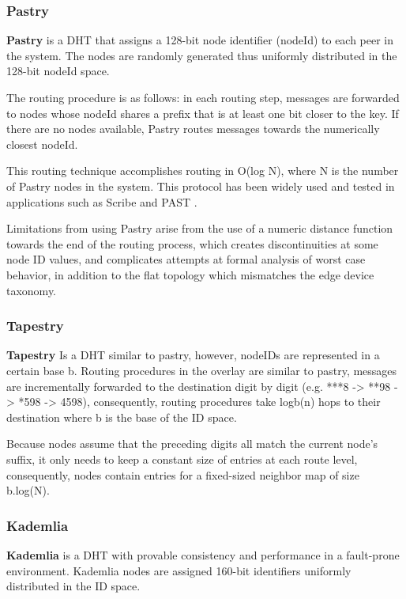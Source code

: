 \subsubsection*{Pastry}

\textbf{Pastry} \cite{rowstron2001pastry} is a DHT that assigns a 128-bit node identifier (nodeId) to each peer in the system. The nodes are randomly generated thus uniformly distributed in the 128-bit nodeId space. 

The routing procedure is as follows: in each routing step, messages are forwarded to nodes whose nodeId shares a prefix that is at least one bit closer to the key. If there are no nodes available, Pastry routes messages towards the numerically closest nodeId. 

This routing technique accomplishes routing in O(log N), where N is the number of Pastry nodes in the system. This protocol has been widely used and tested in applications such as Scribe \cite{10.1007/3-540-45546-9_3} and PAST \cite{990064}. 

Limitations from using Pastry arise from the use of a numeric distance function towards the end of the routing process, which creates discontinuities at some node ID values, and complicates attempts at formal analysis of worst case behavior, in addition to the flat topology which mismatches the edge device taxonomy.

\subsubsection*{Tapestry}

\textbf{Tapestry} \cite{tapestry} Is a DHT similar to pastry, however, nodeIDs are represented in a certain base b. Routing procedures in the overlay are similar to pastry, messages are incrementally forwarded to the destination digit by digit (e.g. ***8 -> **98 -> *598 -> 4598), consequently, routing procedures take logb(n) hops to their destination where b is the base of the ID space. 

Because nodes assume that the preceding digits all match the current node's suffix, it only needs to keep a constant size of entries at each route level, consequently, nodes contain entries for a fixed-sized neighbor map of size b.log(N). 

\subsubsection*{Kademlia}

\textbf{Kademlia} \cite{maymounkov2002kademlia} is a DHT with provable consistency and performance in a fault-prone environment. Kademlia nodes are assigned 160-bit identifiers uniformly distributed in the ID space.

